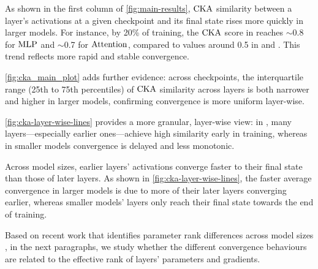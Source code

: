 \begin{result}
\label{result:cka}


As shown in the first column of \cref{fig:main-results}, $\mathrm{CKA}$ similarity between a layer's activations at a given checkpoint and its final state rises more quickly in larger models. For instance, by 20\% of training, the $\mathrm{CKA}$ score in \twobil reaches $\sim$0.8 for $\mathrm{MLP}$ and $\sim$0.7 for $\mathrm{Attention}$, compared to values around 0.5 in \sevenmil and \sixmil. This trend reflects more rapid and stable convergence.

\cref{fig:cka_main_plot} adds further evidence: across checkpoints, the interquartile range (25th to 75th percentiles) of $\mathrm{CKA}$ similarity across layers is both narrower and higher in larger models, confirming convergence is more uniform layer-wise.

\cref{fig:cka-layer-wise-lines} provides a more granular, layer-wise view: in \twobil, many layers—especially earlier ones—achieve high similarity early in training, whereas in smaller models convergence is delayed and less monotonic.

\end{result}

\begin{result}
Across model sizes, earlier layers' activations converge faster to their final state than those of later layers. As shown in \cref{fig:cka-layer-wise-lines}, the faster average convergence in larger models is due to more of their later layers converging earlier, whereas smaller models' layers only reach their final state towards the end of training.
\end{result}

\vspace{9pt}
Based on recent work that identifies parameter rank differences across model sizes \citep{godey2024small}, in the next paragraphs, we study whether the different convergence behaviours are related to the effective rank of layers' parameters and gradients.
\vspace{9pt}


